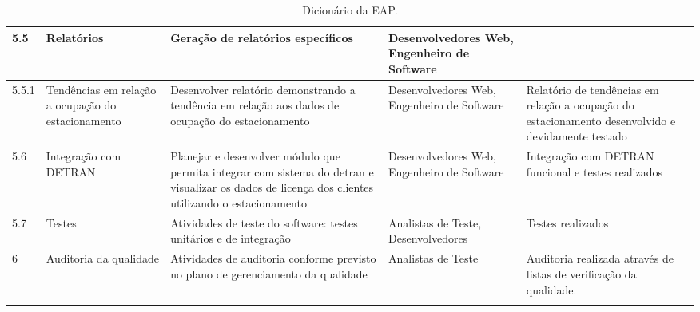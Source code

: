 \begin{landscape}
\begin{longtable}{@{\extracolsep{\fill}}  l  p{}  p{}  p{}  p{}  }
		5.5                    & Relatórios                                              & Geração de relatórios específicos                                                                                                                                            & Desenvolvedores Web, Engenheiro de Software                                                      &                                                                                                          \\*
		\midrule
		5.5.1                  & Tendências em relação a ocupação do estacionamento  & Desenvolver relatório demonstrando a tendência em relação aos dados de ocupação do estacionamento                                                                          & Desenvolvedores Web, Engenheiro de Software                                                      & Relatório de tendências em relação a ocupação do estacionamento desenvolvido e devidamente testado \\*
		\midrule
		5.6                    & Integração com DETRAN                                  & Planejar e desenvolver módulo que permita integrar com sistema do detran e visualizar os dados de licença dos clientes utilizando o estacionamento                             & Desenvolvedores Web, Engenheiro de Software                                                      & Integração com DETRAN funcional e testes realizados                                                    \\*
		\midrule
		5.7                    & Testes                                                   & Atividades de teste do software: testes unitários e de integração                                                                                                             & Analistas de Teste, Desenvolvedores                                                              & Testes realizados                                                                                        \\*
		\midrule
		6                      & Auditoria da qualidade                                   & Atividades de auditoria conforme previsto no plano de gerenciamento da qualidade                                                                                                 & Analistas de Teste                                                                               & Auditoria realizada através de listas de verificação da qualidade.                                    \\*
		\bottomrule
		\caption{Dicionário da EAP.}
		\centering
	\end{longtable}

\end{landscape}